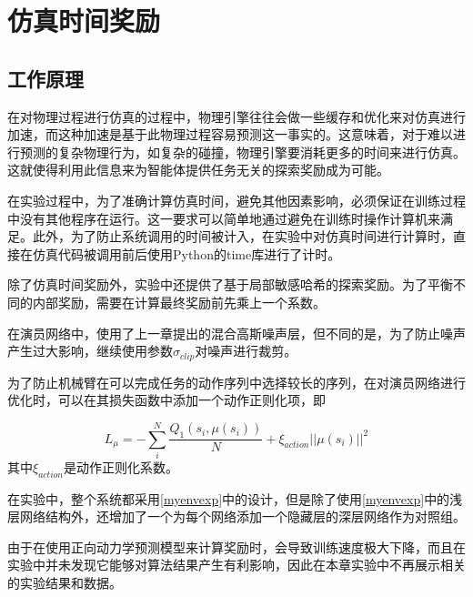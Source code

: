 \chapter{仿真时间奖励}

\section{工作原理}
在对物理过程进行仿真的过程中，物理引擎往往会做一些缓存和优化来对仿真进行加速，而这种加速是基于此物理过程容易预测这一事实的。这意味着，对于难以进行预测的复杂物理行为，如复杂的碰撞，物理引擎要消耗更多的时间来进行仿真。这就使得利用此信息来为智能体提供任务无关的探索奖励成为可能。

在实验过程中，为了准确计算仿真时间，避免其他因素影响，必须保证在训练过程中没有其他程序在运行。这一要求可以简单地通过避免在训练时操作计算机来满足。此外，为了防止系统调用的时间被计入，在实验中对仿真时间进行计算时，直接在仿真代码被调用前后使用Python的time库进行了计时。

除了仿真时间奖励外，实验中还提供了基于局部敏感哈希的探索奖励。为了平衡不同的内部奖励，需要在计算最终奖励前先乘上一个系数。

在演员网络中，使用了上一章提出的混合高斯噪声层，但不同的是，为了防止噪声产生过大影响，继续使用参数$\sigma_{clip}$对噪声进行裁剪。

为了防止机械臂在可以完成任务的动作序列中选择较长的序列，在对演员网络进行优化时，可以在其损失函数中添加一个动作正则化项，即

   $$ L_\mu = -\sum_i^N\frac{Q_1(s_i, \mu(s_i))}{N} + \xi_{action}||\mu(s_i)||^2$$
其中$\xi_{action}$是动作正则化系数。

在实验中，整个系统都采用\ref{myenvexp}中的设计，但是除了使用\ref{myenvexp}中的浅层网络结构外，还增加了一个为每个网络添加一个隐藏层的深层网络作为对照组。

由于在使用正向动力学预测模型来计算奖励时，会导致训练速度极大下降，而且在实验中并未发现它能够对算法结果产生有利影响，因此在本章实验中不再展示相关的实验结果和数据。

